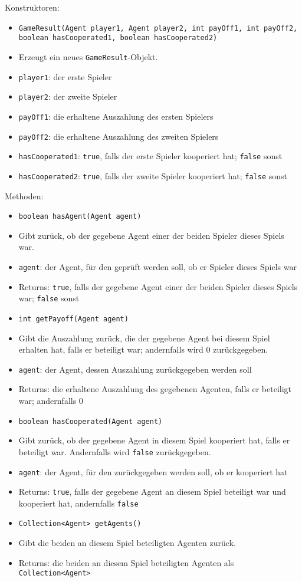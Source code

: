 \documentclass[parskip=full,11pt]{scrartcl}
\begin{document}
Konstruktoren:
\begin{itemize}\itemsep -10pt
\item \texttt{GameResult(Agent player1, Agent player2, int payOff1, int payOff2, boolean hasCooperated1, boolean hasCooperated2)}
\item[] Erzeugt ein neues \texttt{GameResult}-Objekt.
\item[] \texttt{player1}: der erste Spieler
\item[] \texttt{player2}: der zweite Spieler
\item[] \texttt{payOff1}: die erhaltene Auszahlung des ersten Spielers
\item[] \texttt{payOff2}: die erhaltene Auszahlung des zweiten Spielers
\item[] \texttt{hasCooperated1}: \texttt{true}, falls der erste Spieler kooperiert hat; \texttt{false} sonst
\item[] \texttt{hasCooperated2}: \texttt{true}, falls der zweite Spieler kooperiert hat; \texttt{false} sonst
\end{itemize}

Methoden:
\begin{itemize}\itemsep -10pt
\item  \texttt{boolean hasAgent(Agent agent)}
\item[] Gibt zurück, ob der gegebene Agent einer der beiden Spieler dieses Spiels war.
\item[] \texttt{agent}: der Agent, für den geprüft werden soll, ob er Spieler dieses Spiels war
\item[] Returns: \texttt{true}, falls der gegebene Agent einer der beiden Spieler dieses Spiels war; \texttt{false} sonst

\item \texttt{int getPayoff(Agent agent)}
\item[] Gibt die Auszahlung zurück, die der gegebene Agent bei diesem Spiel erhalten hat, falls er beteiligt war; andernfalls wird \(0\) zurückgegeben.
\item[] \texttt{agent}: der Agent, dessen Auszahlung zurückgegeben werden soll
\item[] Returns: die erhaltene Auszahlung des gegebenen Agenten, falls er beteiligt war; andernfalls \(0\)

\item \texttt{boolean hasCooperated(Agent agent)}
\item[] Gibt zurück, ob der gegebene Agent in diesem Spiel kooperiert hat, falls er beteiligt war. Andernfalls wird \texttt{false} zurückgegeben.
\item[] \texttt{agent}: der Agent, für den zurückgegeben werden soll, ob er kooperiert hat
\item[] Returns: \texttt{true}, falls der gegebene Agent an diesem Spiel beteiligt war und kooperiert hat, andernfalls \texttt{false}

\item \texttt{Collection<Agent> getAgents()}
\item[] Gibt die beiden an diesem Spiel beteiligten Agenten zurück.
\item[] Returns: die beiden an diesem Spiel beteiligten Agenten als \texttt{Collection<Agent>}
\end{itemize}
\end{document}
